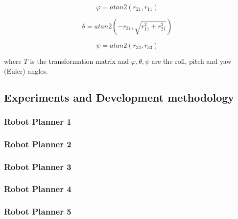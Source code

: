 \[
φ = atan2(r_{21}, r_{11})
\]

\[
θ = atan2(-r_{31}, \sqrt{r_{11}^2 + r_{21}^2})
\]

\[
ψ = atan2(r_{32}, r_{33})
\]

where $T$ is the transformation matrix and $φ, θ, ψ$ are the roll, pitch and yaw (Euler) angles.




\subsection{Experiments and Development methodology}

\subsubsection{Robot Planner 1}

\subsubsection{Robot Planner 2}

\subsubsection{Robot Planner 3}

\subsubsection{Robot Planner 4}

\subsubsection{Robot Planner 5}

